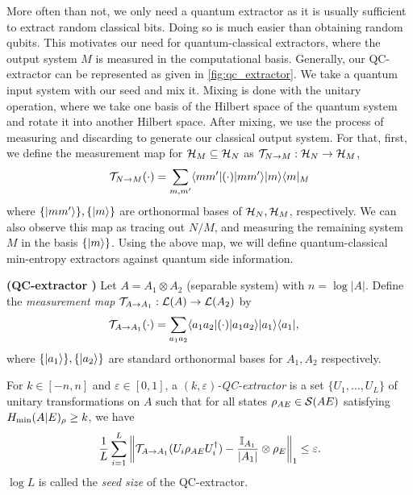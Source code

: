 More often than not, we only need a quantum extractor as it is usually sufficient to extract random classical bits. Doing so is much easier than obtaining random qubits. This motivates our need for quantum-classical extractors, where the output system $M$ is measured in the computational basis. Generally, our QC-extractor can be represented as given in \autoref{fig:qc_extractor}. We take a quantum input system with our seed and mix it. Mixing is done with the unitary operation, where we take one basis of the Hilbert space of the quantum system and rotate it into another Hilbert space. After mixing, we use the process of measuring and discarding to generate our classical output system. For that, first, we define the measurement map for $\mathcal{H}_M \subseteq \mathcal{H}_N$ as $\mathcal{T}_{N \to M}: \mathcal{H}_N \rightarrow \mathcal{H}_M$,
\begin{align*}
    \mathcal{T}_{N \to M}(\cdot) = \sum_{m, m'} \langle mm'| (\cdot) |mm' \rangle |m \rangle \langle  m |_{M}
    \label{eq:measurement_map}
\end{align*} 
where $\{ |mm' \rangle\}, \{|m \rangle\}$ are orthonormal bases of $\mathcal{H}_{N}, \mathcal{H}_{M}$, respectively. We can also observe this map as tracing out $N / M$, and measuring the remaining system $M$ in the basis $\{|m \rangle\}$. Using the above map, we will define quantum-classical min-entropy extractors against quantum side information.

\begin{definition}\textbf{(QC-extractor \cite{Berta_2014})}\label{def:measurement_map}
    Let $A = A_{1} \otimes A_{2}$ (separable system) with $n = \log |A|$. Define the \emph{measurement map} $\mathcal{T}_{A \to A_{1}}: \mathcal{L}(A) \to \mathcal{L}(A_{2})$ by 
    \begin{align}
        \mathcal{T}_{A \to A_{1}}(\cdot) 
        &= \sum_{a_{1} a_{2}} \langle a_{1} a_{2}| (\cdot) |a_{1} a_{2} \rangle |a_{1} \rangle \langle a_{1}|,
    \end{align}
    where $\{|a_{1} \rangle\}, \{|a_{2} \rangle\}$ are standard orthonormal bases for $A_{1}, A_{2}$ respectively. 
    
    For $k \in [-n, n]$ and $\varepsilon \in [0, 1]$, a \emph{$(k, \varepsilon)$-QC-extractor} is a set $\{U_{1}, \dots, U_{L}\}$ of unitary transformations on $A$ such that for all states $\rho_{AE} \in \mathcal{S}(AE)$ satisfying $H_{{\min}}(A|E)_{\rho} \ge k$, we have 
    \begin{align*}
        \frac{1}{L} 
        \sum_{i = 1}^{L} 
        \left\|\mathcal{T}_{A \to A_{1}}(U_{i} \rho_{AE} U_{i}^{\dagger}) - \frac{\mathbb{I}_{A_{1}}}{|A_{1}|} \otimes \rho_{E}\right\|_{1} \le \varepsilon. 
    \end{align*}
    $\log L$ is called the \emph{seed size} of the QC-extractor. 
\end{definition}

